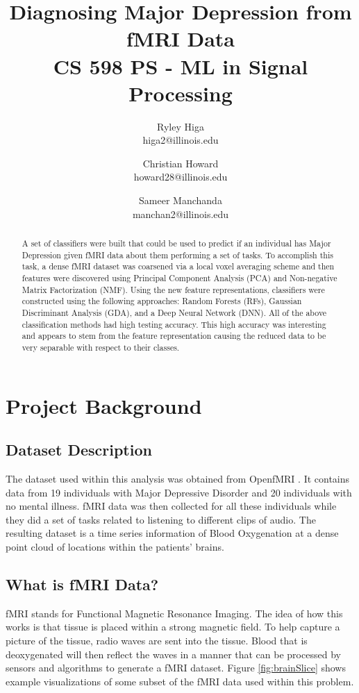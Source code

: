 \documentclass{article}[12pt]
\title{Diagnosing Major Depression from fMRI Data \\ CS 598 PS - ML in Signal Processing}
\author{
Ryley Higa \\ higa2@illinois.edu
\and 
Christian Howard \\ howard28@illinois.edu
\and
Sameer Manchanda \\ manchan2@illinois.edu
}
\date{} %
\begin{document}
   
   \maketitle
   \begin{abstract}
   A set of classifiers were built that could be used to predict if an individual has Major Depression given fMRI data about them performing a set of tasks. To accomplish this task, a dense fMRI dataset was coarsened via a local voxel averaging scheme and then features were discovered using Principal Component Analysis (PCA) and Non-negative Matrix Factorization (NMF). Using the new feature representations, classifiers were constructed using the following approaches: Random Forests (RFs), Gaussian Discriminant Analysis (GDA), and a Deep Neural Network (DNN). All of the above classification methods had high testing accuracy. This high accuracy was interesting and appears to stem from the feature representation causing the reduced data to be very separable with respect to their classes.
   \end{abstract}
   \newpage
   
   \tableofcontents
   \newpage
   
   \section{Project Background}
   \subsection{Dataset Description}
   The dataset used within this analysis was obtained from OpenfMRI \cite{dataset}. It contains data from 19 individuals with Major Depressive Disorder and 20 individuals with no mental illness. fMRI data was then collected for all these individuals while they did a set of tasks related to listening to different clips of audio. The resulting dataset is a time series information of Blood Oxygenation at a dense point cloud of locations within the patients’ brains.
   
   \subsection{What is fMRI Data?}
   fMRI stands for Functional Magnetic Resonance Imaging. The idea of how this works is that tissue is placed within a strong magnetic field. To help capture a picture of the tissue, radio waves are sent into the tissue. Blood that is deoxygenated will then reflect the waves in a manner that can be processed by sensors and algorithms to generate a fMRI dataset. Figure \ref{fig:brainSlice} shows example visualizations of some subset of the fMRI data used within this problem.
   
\end{document}
